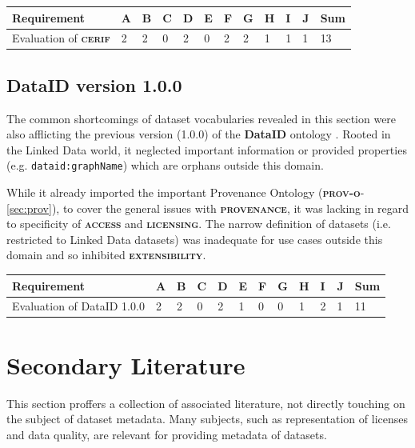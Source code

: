 \documentclass[a4paper,english,twoside,BCOR1.5cm,headsepline,DIV12,appendixprefix,final,12pt]{scrbook}
\newcommand{\provenance}{{\ttfamily\scshape\bfseries provenance}\xspace}
\newcommand{\licensing}{{\ttfamily\scshape\bfseries licensing}\xspace}
\newcommand{\access}{{\ttfamily\scshape\bfseries access}\xspace}
\newcommand{\extensibility}{{\ttfamily\scshape\bfseries extensibility}\xspace}
\newcommand{\dataid}{{\ttfamily\bfseries DataID}\xspace}
\newcommand{\prov}{{\scshape\bfseries prov-o}\xspace}
\newcommand{\cerif}{{\scshape\bfseries cerif}\xspace}
\newcommand{\prop}[1]{{{\texttt{#1}}}}
\begin{document}
\begin{table}[!htbp]
    \centering
    \begin{tabular}{|l|l|l|l|l|l|l|l|l|l|l|l|}
        \hline
        Requirement & A & B & C & D & E & F & G & H & I & J & Sum \\
        \hline
        Evaluation of \cerif & 2 & 2 & 0 & 2 & 0 & 2 & 2 & 1 & 1 & 1 & 13 \\
        \hline
    \end{tabular}
    \label{tab:evaldcatap}
\end{table}


\subsection{DataID version 1.0.0}
\label{sec:dataid100}

The common shortcomings of dataset vocabularies revealed in this section were also afflicting the previous version (1.0.0) of the \dataid ontology \cite{dataID2014}. Rooted in the Linked Data world, it neglected important information or provided properties (e.g. \prop{dataid:graphName}) which are orphans outside this domain. 

While it already imported the important Provenance Ontology (\prov  - \cref{sec:prov}), to cover the general issues with \provenance, it was lacking in regard to specificity of \access and \licensing. The narrow definition of datasets (i.e. restricted to Linked Data datasets) was inadequate for use cases outside this domain and so inhibited \extensibility.

\begin{table}[!htbp]
    \centering
    \begin{tabular}{|l|l|l|l|l|l|l|l|l|l|l|l|}
        \hline
        Requirement & A & B & C & D & E & F & G & H & I & J & Sum \\
        \hline
        Evaluation of DataID 1.0.0 & 2 & 2 & 0 & 2 & 1 & 0 & 0 & 1 & 2 & 1 & 11 \\
        \hline
    \end{tabular}
    \label{tab:evaldataid100}
\end{table}

\pagebreak
\section{Secondary Literature}
\label{sec:auxiliary}

This section proffers a collection of associated literature, not directly touching on the subject of dataset metadata. Many subjects, such as representation of licenses and data quality, are relevant for providing metadata of datasets.
\end{document}
